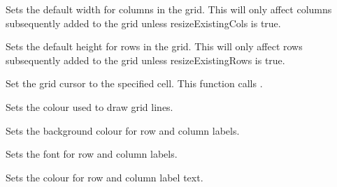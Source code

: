 \label{wxgridsetdefaultcolsize}


Sets the default width for columns in the grid. This will only affect columns subsequently added to
the grid unless resizeExistingCols is true. 

\label{wxgridsetdefaultrowsize}


Sets the default height for rows in the grid. This will only affect rows subsequently added
to the grid unless resizeExistingRows is true.

\label{wxgridsetgridcursor}


Set the grid cursor to the specified cell. 
This function calls .

\label{wxgridsetgridlinecolour}


Sets the colour used to draw grid lines.

\label{wxgridsetlabelbackgroundcolour}


Sets the background colour for row and column labels.

\label{wxgridsetlabelfont}


Sets the font for row and column labels.

\label{wxgridsetlabeltextcolour}


Sets the colour for row and column label text.

\label{wxgridsetreadonly}


